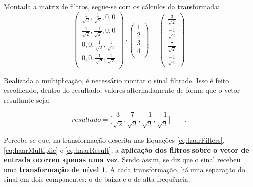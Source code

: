 \documentclass[a4paper,12pt,openright,oneside]{book}
\newenvironment{myenv}[1]
  {\begin{spacing}{#1}}
  {\end{spacing}}
\begin{document}
\begin{myenv}{1.5}
							\par Montada a matriz de filtros, segue-se com os cálculos da transformada:
							\begin{equation}
								\begin{pmatrix}
									\frac{1}{\sqrt{2}}, \frac{1}{\sqrt{2}}, 0, 0\\
									\frac{1}{\sqrt{2}}, \frac{-1}{\sqrt{2}}, 0, 0\\
									0, 0, \frac{1}{\sqrt{2}}, \frac{1}{\sqrt{2}}\\
									0, 0, \frac{1}{\sqrt{2}}, \frac{1}{\sqrt{2}}\\
								\end{pmatrix} 
								\cdot
								\begin{pmatrix}
									1\\
									2\\
									3\\
									4\\
								\end{pmatrix} 
								=
								\begin{pmatrix}
									\frac{3}{\sqrt{2}}\\
									\frac{-1}{\sqrt{2}}\\
									\frac{7}{\sqrt{2}}\\
									\frac{-1}{\sqrt{2}}
								\end{pmatrix}
								\label{eq:haarMultiplic}
							\end{equation}
							
							\par Realizada a multiplicação, é necessário montar o sinal filtrado. Isso é feito escolhendo, dentro do resultado, valores alternadamente de forma que o vetor resultante seja:
							
							\begin{equation}
								resultado = \Big[
								\frac{3}{\sqrt{2}},
								\frac{7}{\sqrt{2}},
								\frac{-1}{\sqrt{2}},
								\frac{-1}{\sqrt{2}}
								\Big]\qquad.
								\label{eq:haarResult}
							\end{equation}
							
							\par Percebe-se que, na transformação descrita nas Equações \ref{eq:haarFilters}, \ref{eq:haarMultiplic} e \ref{eq:haarResult}, a \textbf{aplicação dos filtros sobre o vetor de entrada ocorreu apenas uma vez}. Sendo assim, se diz que o sinal recebeu uma \textbf{transformação de nível 1}. A cada transformação, há uma separação do sinal em dois componentes: o de baixa e o de alta frequência.
							

\end{myenv}
\end{document}
